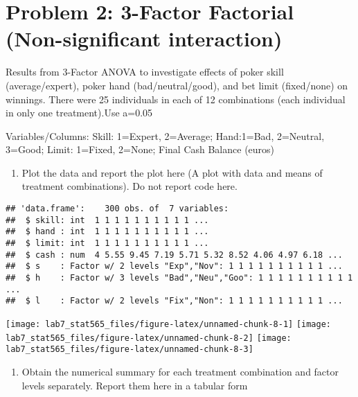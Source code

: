 \documentclass[]{article}
\providecommand{\tightlist}{%
  \setlength{\itemsep}{0pt}\setlength{\parskip}{0pt}}
\begin{document}
\hypertarget{problem-2-3-factor-factorial-non-significant-interaction}{%
\section{Problem 2: 3-Factor Factorial (Non-significant
interaction)}\label{problem-2-3-factor-factorial-non-significant-interaction}}

\textcolor[rgb]{0.5,0.5,0.5}{Results from 3-Factor ANOVA to investigate effects of poker skill (average/expert), poker hand (bad/neutral/good), and bet limit (fixed/none) on winnings. There were 25 individuals in each of 12 combinations (each individual in only one treatment).Use a=0.05}

\textcolor[rgb]{0.5,0.5,0.5}{Variables/Columns:
Skill: 1=Expert, 2=Average; Hand:1=Bad, 2=Neutral, 3=Good; Limit: 1=Fixed, 2=None; Final Cash Balance (euros)}

\begin{enumerate}
\def\labelenumi{(\alph{enumi})}
\tightlist
\item
  \textcolor[rgb]{0.5,0.5,0.5}{Plot the data and report the plot here (A plot with data and means of treatment combinations). Do not report code here.}
\end{enumerate}

\begin{verbatim}
## 'data.frame':    300 obs. of  7 variables:
##  $ skill: int  1 1 1 1 1 1 1 1 1 1 ...
##  $ hand : int  1 1 1 1 1 1 1 1 1 1 ...
##  $ limit: int  1 1 1 1 1 1 1 1 1 1 ...
##  $ cash : num  4 5.55 9.45 7.19 5.71 5.32 8.52 4.06 4.97 6.18 ...
##  $ s    : Factor w/ 2 levels "Exp","Nov": 1 1 1 1 1 1 1 1 1 1 ...
##  $ h    : Factor w/ 3 levels "Bad","Neu","Goo": 1 1 1 1 1 1 1 1 1 1 ...
##  $ l    : Factor w/ 2 levels "Fix","Non": 1 1 1 1 1 1 1 1 1 1 ...
\end{verbatim}

\texttt{[image: lab7\_stat565\_files/figure-latex/unnamed-chunk-8-1]}
\texttt{[image: lab7\_stat565\_files/figure-latex/unnamed-chunk-8-2]}
\texttt{[image: lab7\_stat565\_files/figure-latex/unnamed-chunk-8-3]}

\begin{enumerate}
\def\labelenumi{(\alph{enumi})}
\setcounter{enumi}{1}
\tightlist
\item
  \textcolor[rgb]{0.5,0.5,0.5}{Obtain the numerical summary for each treatment combination and factor levels separately. Report them here in a tabular form}
\end{enumerate}
\end{document}
